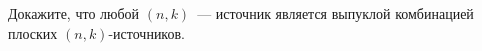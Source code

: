 Докажите, что любой $(n, k)$~--- источник является выпуклой комбинацией плоских $(n, k)$-источников.
